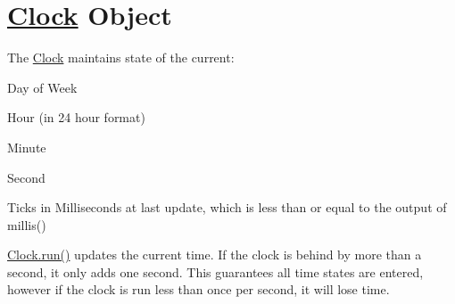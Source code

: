 \section*{\hyperlink{class_clock}{Clock} Object}

The \hyperlink{class_clock}{Clock} maintains state of the current\-:
\begin{DoxyItemize}
\item Day of Week
\item Hour (in 24 hour format)
\item Minute
\item Second
\item Ticks in Milliseconds at last update, which is less than or equal to the output of millis()
\end{DoxyItemize}

\hyperlink{class_clock_ad9b7f50ade881de6a61403a7bc17bbf3}{Clock.\-run()} updates the current time. If the clock is behind by more than a second, it only adds one second. This guarantees all time states are entered, however if the clock is run less than once per second, it will lose time. 